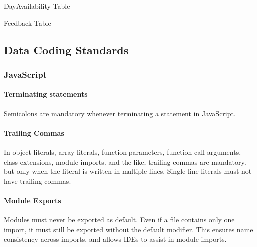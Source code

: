 \pagebreak

DayAvailability Table


Feedback Table

\pagebreak

\subsection{Data Coding Standards}

\subsubsection{JavaScript}
\paragraph{Terminating statements}
Semicolons are mandatory whenever terminating a statement in JavaScript. 

\paragraph{Trailing Commas}
In object literals, array literals, function parameters, function call arguments, class extensions, module imports, and the like, trailing commas are mandatory, but only when the literal is written in multiple lines. Single line literals must not have trailing commas.

\paragraph{Module Exports}
Modules must never be exported as default. Even if a file contains only one import, it must still be exported without the default modifier. This ensures name consistency across imports, and allows IDEs to assist in module imports.

